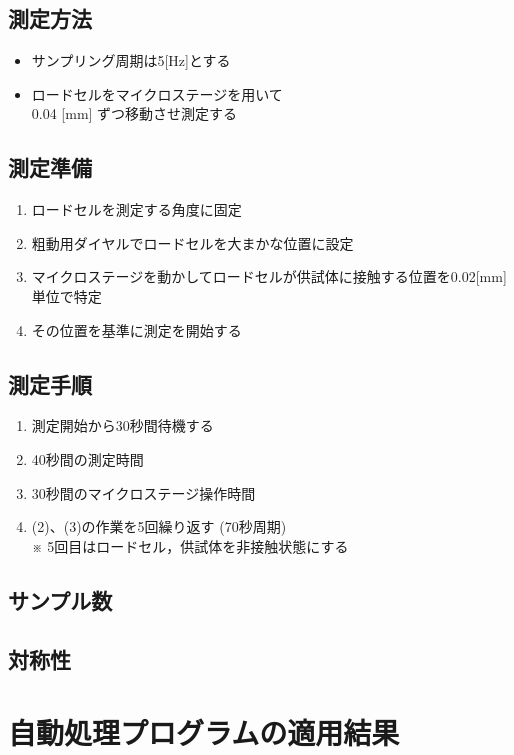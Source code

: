 \documentclass[twocolumn,a4j]{jsarticle}
\begin{document}
\subsection{測定方法}
\begin{itemize}
    \item サンプリング周期は5[Hz]とする
    \item ロードセルをマイクロステージを用いて\\0.04 [mm] ずつ移動させ測定する
\end{itemize}

\subsection{測定準備}
\begin{screen}
    \begin{enumerate}[(1)]
        \item ロードセルを測定する角度に固定
        \item 粗動用ダイヤルでロードセルを大まかな位置に設定
        \item マイクロステージを動かしてロードセルが供試体に接触する位置を0.02[mm]単位で特定
        \item その位置を基準に測定を開始する
    \end{enumerate}
\end{screen}

\subsection{測定手順}
\begin{screen}
    \begin{enumerate}[(1)]
        \item 測定開始から30秒間待機する
        \item 40秒間の測定時間
        \item 30秒間のマイクロステージ操作時間
        \item (2)、(3)の作業を5回繰り返す (70秒周期)\\
              ※ 5回目はロードセル，供試体を非接触状態にする
    \end{enumerate}
\end{screen}

\subsection{サンプル数}
\subsection{対称性}
\section{自動処理プログラムの適用結果}
\end{document}
